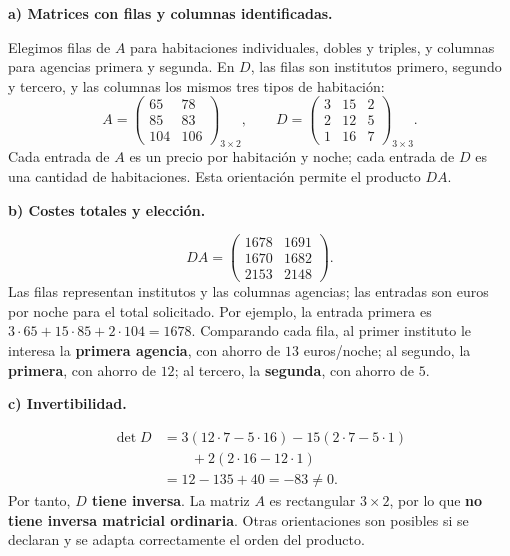 \textbf{a) Matrices con filas y columnas identificadas.}\par\nopagebreak[4]
Elegimos filas de $A$ para habitaciones individuales, dobles y triples, y columnas para agencias primera y segunda. En $D$, las filas son institutos primero, segundo y tercero, y las columnas los mismos tres tipos de habitación:
\[
A=\begin{pmatrix}65&78\\85&83\\104&106\end{pmatrix}_{3\times2},\qquad
D=\begin{pmatrix}3&15&2\\2&12&5\\1&16&7\end{pmatrix}_{3\times3}.
\]
Cada entrada de $A$ es un precio por habitación y noche; cada entrada de $D$ es una cantidad de habitaciones. Esta orientación permite el producto $DA$.

\textbf{b) Costes totales y elección.}\par\nopagebreak[4]
\[
DA=\begin{pmatrix}1678&1691\\1670&1682\\2153&2148\end{pmatrix}.
\]
Las filas representan institutos y las columnas agencias; las entradas son euros por noche para el total solicitado. Por ejemplo, la entrada primera es $3\cdot65+15\cdot85+2\cdot104=1678$.
Comparando cada fila, al primer instituto le interesa la \textbf{primera agencia}, con ahorro de $13$ euros/noche; al segundo, la \textbf{primera}, con ahorro de $12$; al tercero, la \textbf{segunda}, con ahorro de $5$.

\textbf{c) Invertibilidad.}\par\nopagebreak[4]
\[
\begin{aligned}
\det D&=3(12\cdot7-5\cdot16)-15(2\cdot7-5\cdot1)\\
&\qquad+2(2\cdot16-12\cdot1)\\
&=12-135+40=-83\ne0.
\end{aligned}
\]
Por tanto, \textbf{$D$ tiene inversa}. La matriz $A$ es rectangular $3\times2$, por lo que \textbf{no tiene inversa matricial ordinaria}. Otras orientaciones son posibles si se declaran y se adapta correctamente el orden del producto.
